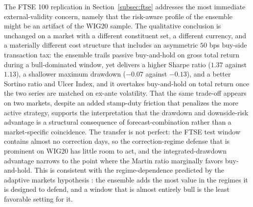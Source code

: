 \documentclass{ieeeaccess}
\newcommand{\FtseMDD}{\ensuremath{-0.07}}
\newcommand{\FtseSharpe}{\ensuremath{1.37}}
\newcommand{\FtseBHmdd}{\ensuremath{-0.13}}
\newcommand{\FtseBHsharpe}{\ensuremath{1.13}}
\begin{document}
The FTSE 100 replication in Section~\ref{subsec:ftse} addresses the most immediate external-validity concern, namely that the risk-aware profile of the ensemble might be an artifact of the WIG20 sample. The qualitative conclusion is unchanged on a market with a different constituent set, a different currency, and a materially different cost structure that includes an asymmetric $50$ bps buy-side transaction tax: the ensemble trails passive buy-and-hold on gross total return during a bull-dominated window, yet delivers a higher Sharpe ratio (\FtseSharpe{} against \FtseBHsharpe{}), a shallower maximum drawdown (\FtseMDD{} against \FtseBHmdd{}), and a better Sortino ratio and Ulcer Index, and it overtakes buy-and-hold on total return once the two series are matched on ex-ante volatility. That the same trade-off appears on two markets, despite an added stamp-duty friction that penalizes the more active strategy, supports the interpretation that the drawdown and downside-risk advantage is a structural consequence of forecast-combination rather than a market-specific coincidence. The transfer is not perfect: the FTSE test window contains almost no correction days, so the correction-regime defense that is prominent on WIG20 has little room to act, and the integrated-drawdown advantage narrows to the point where the Martin ratio marginally favors buy-and-hold. This is consistent with the regime-dependence predicted by the adaptive markets hypothesis \cite{lo2004}: the ensemble adds the most value in the regimes it is designed to defend, and a window that is almost entirely bull is the least favorable setting for it.
\end{document}
